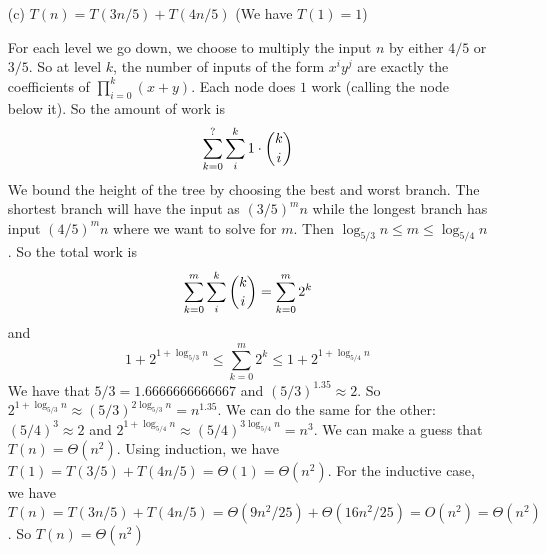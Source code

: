 \documentclass{article}
\begin{document}
\begin{itemize}
            \item [(c)] $T(n) = T(3n / 5) + T(4n / 5)$ (We have $T(1) = 1$)
                \begin{answer}
                    For each level we go down, we choose to multiply the input $n$ by either $4 / 5$ or $3 / 5$. So at level $k$, the number of inputs of the form $x^{i}y^{j}$ are exactly the coefficients of $\prod_{i = 0}^{k}(x + y)$. Each node does $1$ work (calling the node below it). So the amount of work is 
                        \begin{equation*}
                            \sum_{k = 0}^{?}\sum_{i}^{k} 1 \cdot \dbinom{k}{i}
                        \end{equation*}
                    We bound the height of the tree by choosing the best and worst branch. The shortest branch will have the input as $(3 / 5)^{m}n$ while the longest branch has input $(4 / 5)^{m}n$ where we want to solve for $m$. Then $\log_{5 / 3}n \leq m \leq \log_{5 / 4}n$. So the total work is
                        \begin{equation*}
                            \sum_{k = 0}^{m}\sum_{i}^{k} \dbinom{k}{i} = \sum_{k = 0}^{m} 2^{k}
                        \end{equation*}
                    and 
                        \begin{equation*}
                            1 + 2^{1 + \log_{5 / 3}n} \leq \sum_{k = 0}^{m} 2^{k} \leq 1 + 2^{1 + \log_{5 / 4}n}
                        \end{equation*}
                    We have that $5 / 3  = 1.6666666666667$ and $(5 / 3)^{1.35} \approx 2$. So $2^{1 + \log_{5 / 3}n} \approx (5 / 3)^{2\log_{5 / 3}n} = n^{1.35}$. We can do the same for the other: $(5 / 4)^{3} \approx 2$ and $2^{1 + \log_{5 / 4}n} \approx (5 / 4)^{3\log_{5 / 4}n} = n^{3}$. We can make a guess that $T(n) = \Theta(n^{2})$. Using induction, we have $T(1) = T(3 / 5) + T(4n / 5) = \Theta(1) = \Theta(n^{2})$. For the inductive case, we have $T(n) = T(3n / 5) + T(4n / 5) = \Theta(9n^{2} / 25) + \Theta(16n^{2} / 25) = O(n^{2}) = \Theta(n^{2})$. So $T(n) = \Theta(n^{2})$
                \end{answer}
        \end{itemize}
\end{document}
